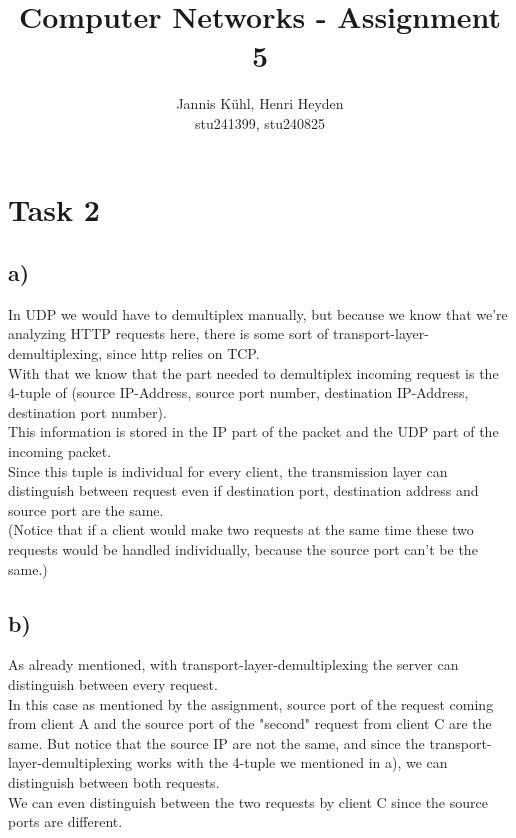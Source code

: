 \documentclass[12pt, a4paper]{article}
\title{Computer Networks - Assignment 5}
\author{Jannis Kühl, Henri Heyden\\ \small stu241399, stu240825}
\date{}
\begin{document}
\maketitle
\section*{Task 2}
\subsection*{a)}
In UDP we would have to demultiplex manually, but because we know that we're analyzing HTTP requests here, there is some sort of transport-layer-demultiplexing, since http relies on TCP.\\
With that we know that the part needed to demultiplex incoming request is the 4-tuple of (source IP-Address, source port number, destination IP-Address, destination port number). \\
This information is stored in the IP part of the packet and the UDP part of the incoming packet. \\
Since this tuple is individual for every client, the transmission layer can distinguish between request even if destination port, destination address and source port are the same.\\
(Notice that if a client would make two requests at the same time these two requests would be handled individually, because the source port can't be the same.)
\subsection*{b)}
As already mentioned, with transport-layer-demultiplexing the server can distinguish between every request. \\
In this case as mentioned by the assignment, source port of the request coming from client A and the source port of the "second" request from client C are the same. But notice that the source IP are not the same, and since the transport-layer-demultiplexing works with the 4-tuple we mentioned in a), we can distinguish between both requests. \\
We can even distinguish between the two requests by client C since the source ports are different.
\end{document}
